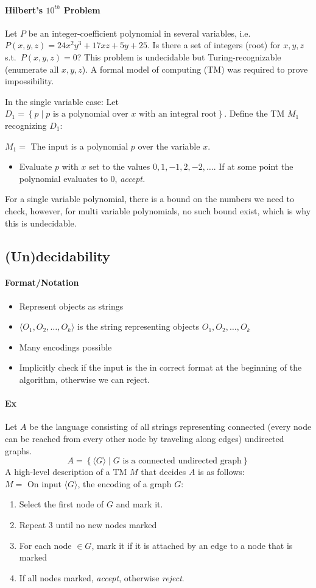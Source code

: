 \documentclass[12 pt]{article}
\begin{document}
\paragraph{Hilbert's $10^{th}$ Problem}
Let $P$ be an integer-coefficient polynomial in several variables,
i.e.\ $P(x,y,z)=24x^2y^3+17xz+5y+25$. Is there a set of integers
(root) for $x,y,z$ s.t.\ $P(x,y,z)=0$? This problem is undecidable but
Turing-recognizable (enumerate all $x,y,z$). A formal model of
computing (TM) was required to prove impossibility.

In the single variable case: Let $D_1 = \left\{p \mid p \text{ is a
    polynomial over } x \text{ with an integral root}\right\}$. Define
the TM $M_1$ recognizing $D_1$:

$M_1 =$ The input is a polynomial $p$ over the variable $x$.
\begin{itemize}
\item Evaluate $p$ with $x$ set to the values $0, 1, -1,
  2, -2, \ldots$. If at some point the polynomial evaluates to $0$,
  \textit{accept.}
\end{itemize}
For a single variable polynomial, there is a bound on the numbers we
need to check, however, for multi variable polynomials, no such bound
exist, which is why this is undecidable.
\subsection{(Un)decidability}
\paragraph{Format/Notation}
\begin{itemize}
\item Represent objects as strings
\item $\langle O_1, O_2, \ldots, O_k \rangle$ is the string
  representing objects $O_1, O_2, \ldots, O_k$
\item Many encodings possible
\item Implicitly check if the input is the in correct format at the
  beginning of the algorithm, otherwise we can reject.
\end{itemize}
\paragraph{Ex} Let $A$ be the language consisting of all strings
representing connected (every node can be reached from
every other node by traveling along edges) undirected graphs.
$$A = \left\{\langle G \rangle \mid G \text{ is a connected undirected
    graph}\right\}$$
A high-level description of a TM $M$ that decides $A$ is as follows:
\\ $M = $ On input $\langle G \rangle$, the encoding of a graph $G$:
\begin{enumerate}
\item Select the first node of $G$ and mark it.
\item Repeat 3 until no new nodes marked
\item For each node $\in G$, mark it if it is attached by an edge to a
  node that is marked
\item If all nodes marked, \textit{accept}, otherwise \textit{reject}.
\end{enumerate}
\end{document}
